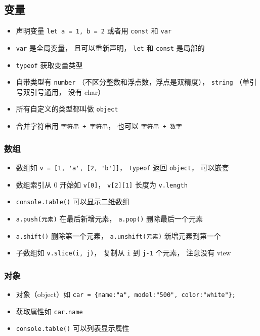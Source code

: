 \subsection{变量}
\begin{itemize}
\item 声明变量 \verb|let a = 1, b = 2| 或者用 \verb|const| 和 \verb|var|
\item \verb|var| 是全局变量， 且可以重新声明， \verb|let| 和 \verb|const| 是局部的
\item \verb|typeof| 获取变量类型
\item 自带类型有 \verb|number| （不区分整数和浮点数，浮点是双精度）， \verb|string| （单引号双引号通用， 没有 char）
\item 所有自定义的类型都叫做 \verb|object|
\item 合并字符串用 \verb|字符串 + 字符串|， 也可以 \verb|字符串 + 数字|
\end{itemize}

\subsubsection{数组}
\begin{itemize}
\item 数组如 \verb|v = [1, 'a', [2, 'b']]|， \verb|typeof| 返回 \verb|object|， 可以嵌套
\item 数组索引从 0 开始如 \verb|v[0]|， \verb|v[2][1]| 长度为 \verb|v.length|
\item \verb|console.table()| 可以显示二维数组
\item \verb|a.push(元素)| 在最后新增元素， \verb|a.pop()| 删除最后一个元素
\item \verb|a.shift()| 删除第一个元素， \verb|a.unshift(元素)| 新增元素到第一个
\item 子数组如 \verb|v.slice(i, j)|， 复制从 \verb|i| 到 \verb|j-1| 个元素， 注意没有 view
\end{itemize}

\subsubsection{对象}
\begin{itemize}
\item 对象（object）如 \verb|car = {name:"a", model:"500", color:"white"};|
\item 获取属性如 \verb|car.name|
\item \verb|console.table()| 可以列表显示属性
\end{itemize}

